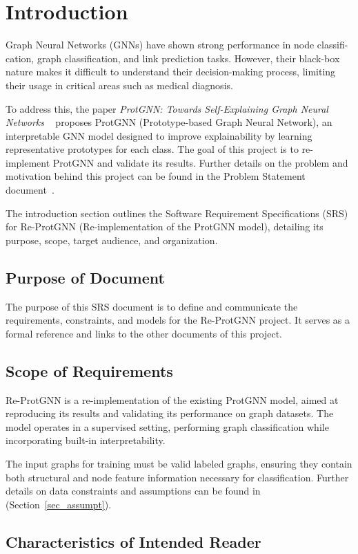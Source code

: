 \documentclass[12pt]{article}
\begin{document}
\section{Introduction}

Graph Neural Networks (GNNs) have shown strong performance in node classifi-
cation, graph classification, and link prediction tasks. However, their black-box
nature makes it difficult to understand their decision-making process, limiting
their usage in critical areas such as medical diagnosis. 

To address this, the paper \textit{ProtGNN: Towards Self-Explaining Graph Neural Networks} ~\cite{zhang2022} proposes ProtGNN (Prototype-based Graph Neural Network), an interpretable GNN model designed to improve explainability by learning representative prototypes for each class. The goal of this project is to re-implement ProtGNN and validate its results. Further details on the problem and motivation behind this project can be found in the Problem Statement document~\cite{yuanqi2025protgnn}.

The introduction section outlines the Software Requirement Specifications (SRS) for Re-ProtGNN (Re-implementation of the ProtGNN model), detailing its purpose, scope, target audience, and organization.

\subsection{Purpose of Document}
The purpose of this SRS document is to define and communicate the requirements, constraints, and models for the Re-ProtGNN project. It serves as a formal reference and links to the other documents of this project.


\subsection{Scope of Requirements} 
Re-ProtGNN is a re-implementation of the existing ProtGNN model, aimed at reproducing its results and validating its performance on graph datasets. The model operates in a supervised setting, performing graph classification while incorporating built-in interpretability. 

The input graphs for training must be valid labeled graphs, ensuring they contain both structural and node feature information necessary for classification. Further details on data constraints and assumptions can be found in (Section~\ref{sec_assumpt}).


\subsection{Characteristics of Intended Reader} \label{sec_IntendedReader}
\end{document}
